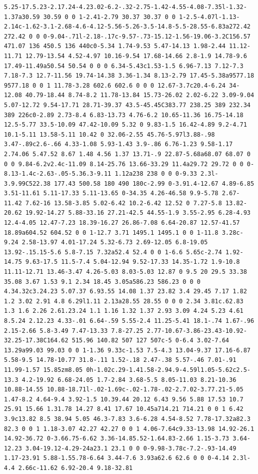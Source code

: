 \documentclass[11pt]{article}
\begin{document}
\begin{enumerate}
\begin{verbatim}
5.25-17.5.23-2.17.24-4.23.02-6.2-.32-2.75-1.42-4.55-4.08-7.35l-1.32-1.37a30.59 30.59 0 0 1-2.41-2.79 30.37 30.37 0 0 1-2.5-4.07l-1.13-2.14c-1.62-3.1-2.68-4.6-4.12-5.56-5.26-3.5-14.8-5.5-28.55-6.83a272.42 272.42 0 0 0-9.04-.71l-2.18-.17c-9.57-.73-15.12-1.56-19.06-3.2C156.57 471.07 136 450.5 136 440c0-5.34 1.74-9.53 5.47-14.13 1.98-2.44 11.12-11.71 12.79-13.54 4.52-4.97 10.16-9.54 17.68-14.66 2.8-1.9 14.78-9.6 17.49-11.49a50.54 50.54 0 0 0 6.34-5.43c1.53-1.5 6.96-7.13 7.12-7.3 7.18-7.3 12.7-11.56 19.74-14.38 3.36-1.34 8.13-2.79 17.45-5.38a9577.18 9577.18 0 0 1 11.78-3.28 602.6 602.6 0 0 0 12.67-3.7c20.4-6.24 34-12.08 40.79-18.44 8.74-8.2 11.78-13.84 15.73-26.02 2.02-6.22 3.09-9.04 5.07-12.72 9.54-17.71 28.71-39.37 43.5-45.45C383.77 238.25 389 232.34 389 226c0-2.89 2.73-8.4 6.83-13.73 4.76-6.2 10.65-11.36 16.75-14.18 12.5-5.77 33.5-10.09 47.42-10.09 5.32 0 9.83-1.5 16.42-4.89 9.2-4.71 10.1-5.11 13.58-5.11 10.42 0 32.06-2.55 45.76-5.97l3.88-.98 3.47-.89c2.6-.66 4.33-1.08 5.93-1.43 3.9-.86 6.76-1.23 9.58-1.17 2.74.06 5.47.52 8.67 1.48 4.56 1.37 13.71-.9 22.87-5.68a68.07 68.07 0 0 0 9.84-6.2v2.4c-11.09 8.14-25.76 13.66-33.29 11.4a29.72 29.72 0 0 0-8.13-1.4c-2.63-.05-5.36.3-9.11 1.12a238 238 0 0 0-9.33 2.3l-3.9.99C522.38 177.43 500.58 180 490 180c-2.99 0-3.91.4-12.67 4.89-6.85 3.51-11.61 5.11-17.33 5.11-13.65 0-34.35 4.26-46.58 9.9-5.78 2.67-11.42 7.62-16 13.58-3.85 5.02-6.42 10.2-6.42 12.52 0 7.27-5.8 13.82-20.62 19.92-14.27 5.88-33.16 27.21-42.5 44.55-1.9 3.55-2.95 6.28-4.93 12.4-4.05 12.47-7.23 18.39-16.27 26.86-7.08 6.64-20.87 12.57-41.57 18.89a604.52 604.52 0 0 1-12.7 3.71 1495.1 1495.1 0 0 1-11.8 3.28c-9.24 2.58-13.97 4.01-17.24 5.32-6.73 2.69-12.05 6.8-19.05 13.92-.15.15-5.6 5.8-7.15 7.32a52.4 52.4 0 0 1-6.6 5.65c-2.74 1.92-14.75 9.63-17.5 11.5-7.4 5.04-12.94 9.52-17.33 14.35-1.72 1.9-10.8 11.11-12.71 13.46-3.47 4.26-5.03 8.03-5.03 12.87 0 9.5 20 29.5 33.38 35.08 3.67 1.53 9.1 2.34 18.45 3.05a586.23 586.23 0 0 0 4.34.32c3.24.23 5.07.37 6.93.55 14.08 1.37 23.82 3.4 29.45 7.17 1.82 1.2 3.02 2.91 4.8 6.29l1.11 2.13a28.55 28.55 0 0 0 2.34 3.81c.62.83 1.3 1.6 2.26 2.61.23.24 1.1 1.16 1.32 1.37 2.93 3.09 4.24 5.23 4.61 8.5.24 2.12.23 4.33-.01 6.64-.59 5.55-2.4 11.25-5.41 18.1-.74 1.67-.96 2.15-2.66 5.8-3.49 7.47-13.33 7.8-27.25 2.77-10.67-3.86-23.43-10.92-32.25-17.38C164.62 515.96 140.82 507 127 507c-5 0-6.4 3.02-7.64 13.29a99.03 99.03 0 0 1-1.36 9.33c-1.53 7.5-4.3 13.04-9.37 17.16-6.87 5.58-9.5 14.78-10.77 31.8-.11 1.52-.18 2.47-.38 5.57-.46 7.01-.91 11.99-1.57 15.85zm8.05 0h-1.02c.29-1.41.58-2.94.9-4.59l1.05-5.62c2.5-13.3 4.2-19.92 6.68-24.05 1.7-2.84 3.68-5.5 8.05-11.03 8.21-10.36 10.88-14.55 10.88-18.71l-.02-1.69c-.02-1.78-.02-2.7.02-3.77.21-5.05 1.47-8.2 4.64-9.4 3.92-1.5 10.39.44 20.12 6.43 9.56 5.88 17.53 10.7 25.91 15.66 1.31.78 14.27 8.41 17.67 10.45a714.21 714.21 0 0 1 6.42 3.9c13.82 8.5 38.94 5.05 46.3-7.83 3.6-6.28 4.54-8.52 7.78-17.32a82.3 82.3 0 0 1 1.18-3.07 42.27 42.27 0 0 1 4.06-7.64c9.33-13.98 14.92-26.1 14.92-36.72 0-3.66.75-6.62 3.36-14.85.52-1.64.83-2.66 1.15-3.73 3.64-12.23 3.04-19.12-4.29-24a23.1 23.1 0 0 0-9.98-3.78c-7.2-.93-14.49 1.17-23.91 5.88-1.55.78-6.64 3.44-7.6 3.93a62.6 62.6 0 0 0-4.14 2.3l-4.4 2.66c-11.62 6.92-20.4 9.18-32.81 
\end{verbatim}
\end{enumerate}
\end{document}
